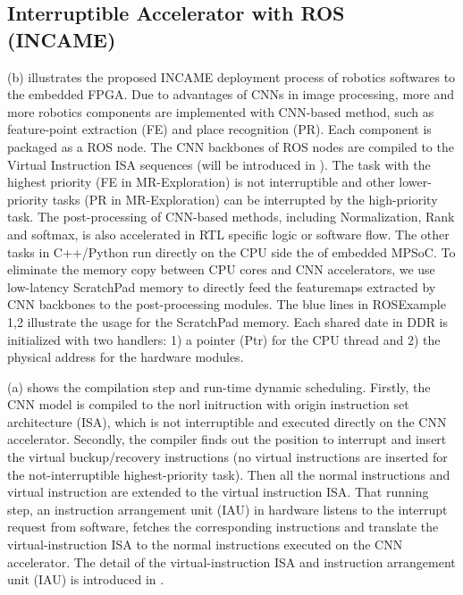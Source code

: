 \subsection{ Interruptible Accelerator with ROS (INCAME) }


(b) illustrates the proposed INCAME deployment process of robotics softwares to the embedded FPGA.
Due to advantages of CNNs in image processing, more and more robotics components are implemented with CNN-based method, such as feature-point extraction (FE) and place recognition (PR).
Each component is packaged as a ROS node.
The CNN backbones of ROS nodes are compiled to the Virtual Instruction ISA sequences (will be introduced in ).
The task with the highest priority (FE in MR-Exploration) is not interruptible and other lower-priority tasks (PR in MR-Exploration) can be interrupted by the high-priority task. The post-processing of CNN-based methods, including Normalization, Rank and softmax, is also accelerated in RTL specific logic or software flow. The other tasks in C++/Python run directly on the CPU side the of embedded MPSoC\cite{MPSoC}. To eliminate the memory copy between CPU cores and CNN accelerators, we use low-latency ScratchPad memory \cite{Banakar2002Scratchpad} to directly feed the featuremaps extracted by CNN backbones to the post-processing modules. The blue lines in  ROSExample 1,2 illustrate the usage for the ScratchPad memory. Each shared date in DDR is initialized with two handlers: 1) a pointer (Ptr) for the CPU thread and 2) the physical address for the hardware modules.

(a) shows the compilation step and run-time dynamic scheduling. Firstly, the CNN model is compiled to the norl initruction with origin instruction set architecture (ISA), which is not interruptible and executed directly on the CNN accelerator.
Secondly, the compiler finds out the position to interrupt and insert the virtual buckup/recovery instructions (no virtual instructions are inserted for the not-interruptible highest-priority task). 
Then all the normal instructions and virtual instruction are extended to the virtual instruction ISA. That running step, an instruction arrangement unit (IAU) in hardware listens to the interrupt request from software, fetches the corresponding instructions and translate the virtual-instruction ISA to the normal instructions executed on the CNN accelerator. The detail of the virtual-instruction ISA and instruction arrangement unit (IAU) is introduced in .

